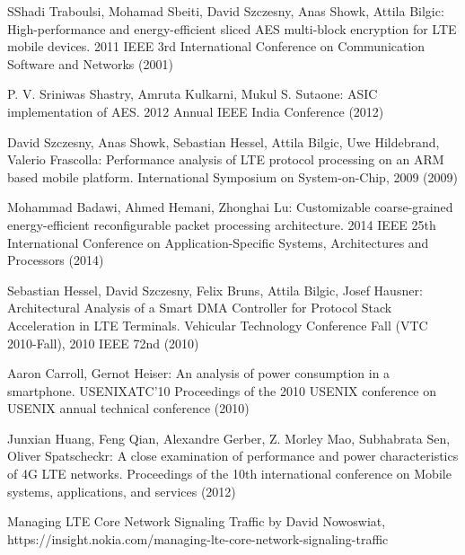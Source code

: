 \documentclass[lnicst,sechang,a4paper]{svmultln}
\begin{document}
\begin{thebibliography}{4}
 SShadi Traboulsi, Mohamad Sbeiti, David Szczesny, Anas Showk, Attila Bilgic: High-performance and energy-efficient sliced AES multi-block encryption for LTE mobile devices. 2011 IEEE 3rd International Conference on Communication Software and Networks (2001)


 P. V. Sriniwas Shastry, Amruta Kulkarni, Mukul S. Sutaone: ASIC implementation of AES. 2012 Annual IEEE India Conference  (2012)

 David Szczesny, Anas Showk, Sebastian Hessel, Attila Bilgic, Uwe Hildebrand, Valerio Frascolla: Performance analysis of LTE protocol processing on an ARM based mobile platform. International Symposium on System-on-Chip, 2009 (2009)


 Mohammad Badawi, Ahmed Hemani, Zhonghai Lu: Customizable coarse-grained energy-efficient reconfigurable packet processing architecture. 2014 IEEE 25th International Conference on Application-Specific Systems, Architectures and Processors (2014)

 Sebastian Hessel, David Szczesny, Felix Bruns, Attila Bilgic, Josef Hausner: Architectural Analysis of a Smart DMA Controller for Protocol Stack Acceleration in LTE Terminals. Vehicular Technology Conference Fall (VTC 2010-Fall), 2010 IEEE 72nd (2010)


 Aaron Carroll, Gernot Heiser: An analysis of power consumption in a smartphone. USENIXATC'10 Proceedings of the 2010 USENIX conference on USENIX annual technical conference (2010)


 Junxian Huang, Feng Qian, Alexandre Gerber, Z. Morley Mao, Subhabrata Sen, Oliver Spatscheckr: A close examination of performance and power characteristics of 4G LTE networks. Proceedings of the 10th international conference on Mobile systems, applications, and services (2012)

 Managing LTE Core Network Signaling Traffic by David Nowoswiat, https://insight.nokia.com/managing-lte-core-network-signaling-traffic

\end{thebibliography}
\end{document}
